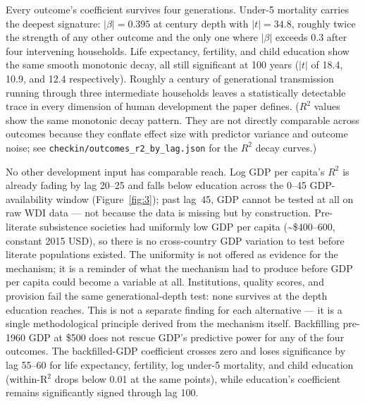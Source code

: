 \documentclass[12pt,letterpaper]{article}
\begin{document}
Every outcome's coefficient survives four generations. Under-5 mortality
carries the deepest signature: $|\beta| = 0.395$ at century depth with
$|t| = 34.8$, roughly twice the strength of any other outcome and the
only one where $|\beta|$ exceeds 0.3 after four intervening households.
Life expectancy, fertility, and child education show the same smooth
monotonic decay, all still significant at 100 years ($|t|$ of 18.4,
10.9, and 12.4 respectively). Roughly a century of generational
transmission running through three intermediate households leaves a
statistically detectable trace
in every dimension of human development the paper defines. ($R^2$
values show the same monotonic decay pattern. They are not directly
comparable across outcomes because they conflate effect size with
predictor variance and outcome noise; see
\texttt{checkin/outcomes\_r2\_by\_lag.json} for the $R^2$ decay
curves.)

No other development input has comparable reach. Log GDP per capita's $R^2$ is
already fading by lag 20--25 and falls below education across the
0--45 GDP-availability window (Figure~\ref{fig:3}); past lag~45,
GDP cannot be tested at all on raw WDI data
--- not because the data is missing but by construction. Pre-literate
subsistence societies had uniformly low GDP per capita
(\textasciitilde\$400--600, constant 2015 USD), so there is
no cross-country GDP variation to test before literate populations
existed. The uniformity is not offered as evidence for the mechanism;
it is a reminder of what the mechanism had to produce before GDP per capita
could become a variable at all. Institutions, quality scores, and
provision fail the same generational-depth test: none survives at the
depth education reaches. This is not a separate finding for each
alternative --- it is a single methodological principle derived from
the mechanism itself. Backfilling pre-1960 GDP at \$500 does not
rescue GDP's predictive power for any of the four outcomes. The
backfilled-GDP coefficient crosses zero and loses significance by lag
55--60 for life expectancy, fertility, log under-5 mortality, and
child education (within-R$^2$ drops below 0.01 at the same points),
while education's coefficient remains significantly signed through lag
100.
\end{document}
